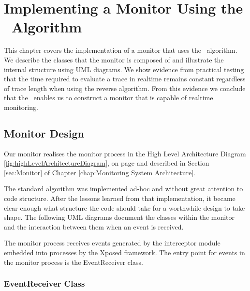 \chapter{Implementing a Monitor Using the \RRH\ Algorithm}
\label{chap:Implementing The Monitor}

This chapter covers the implementation of a monitor that uses the \RRH\ algorithm.  We describe the classes that the monitor is composed of and illustrate the internal structure using UML diagrams.  We show evidence from practical testing that the time required to evaluate a trace in realtime remains constant regardless of trace length when using the reverse algorithm.  From this evidence we conclude that the \RRH\ enables us to construct a monitor that is capable of realtime monitoring.

\section{Monitor Design}
\label{sec:Design}

Our monitor realises the monitor process in the High Level Architecture Diagram \ref{fig:highLevelArchitectureDiagram}, on page \pageref{fig:highLevelArchitectureDiagram} and described in Section \ref{sec:Monitor} of Chapter \ref{chap:Monitoring System Architecture}.

The standard algorithm was implemented ad-hoc and without great attention to code structure.  After the lessons learned from that implementation, it became clear enough what structure the code should take for a worthwhile design to take shape.  The following UML diagrams document the classes within the monitor and the interaction between them when an event is received.

The monitor process receives events generated by the interceptor module embedded into processes by the Xposed framework.  The entry point for events in the monitor process is the EventReceiver class.

\subsection{EventReceiver Class}
\label{sec:EventReceiverClass}

